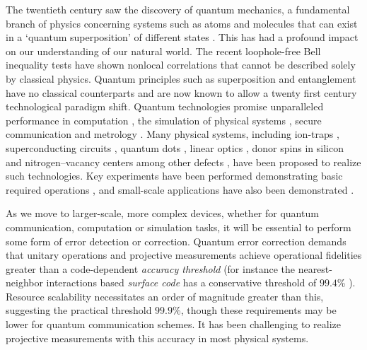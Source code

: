 \documentclass[aps,pra,amsmath,amssymb,reprint,superscriptaddress,tightenlines]{revtex4-1}
\begin{document}
The twentieth century saw the discovery of quantum mechanics, a fundamental branch of physics concerning systems such as atoms and molecules that can exist in a `quantum superposition' of different states \cite{Schrodinger26,vanderWaerden68}. This has had a profound impact on our understanding of our natural world. The recent loophole-free Bell inequality tests \cite{Giustina15,Shalm15,Hensen15,Hensen16} have shown nonlocal correlations that cannot be described solely by classical physics. Quantum principles such as superposition and entanglement \cite{Einstein35,Horodecki09} have no classical counterparts and are now known to allow a twenty first century technological paradigm shift. Quantum technologies promise unparalleled performance in computation \cite{Deutsch92,Simon94,Shor94,Grover96}, the simulation of physical systems \cite{Feynman82,Cirac12,Georgescu14}, secure communication \cite{Wiesner83,Bennett84} and metrology \cite{Giovannetti04,Giovannetti06,Paris09,Giovannetti11,DemkowiczDobrzanski12,Toth14,Taylor14}. Many physical systems, including ion-traps \cite{Cirac95,Wineland98,Cirac00,Kielpinski02,Leibfried03,Porras04,Haffner05,Blatt08, Haffner08,Kim10,Blatt12}, superconducting circuits \cite{Blais04,Wallraff04,You05,Hofheinz08,You11,Houck12,Devoret13,Xiang13,Barends14,Kelly15}, quantum dots \cite{Loss98,Burkard99,Imamoglu99,Benson00,Michler00,Petta05,Hennessy07,Hanson07,Kairdolf13}, linear optics \cite{Knill01,Kok07,OBrien07}, donor spins in silicon \cite{Kane98,Vrijen00,Morton08,Pla12,Tyryshkin12,Steger12,Pla13,Zwanenburg13} and nitrogen--vacancy centers among other defects \cite{Davies92,Zaitsev00,Jelezko06,Wrachtrup06,Greentree08,Weber10,Aharonovich11,Koehl11,Aharonovich11,Dzurak11,Gordon13}, have been proposed to realize such technologies. Key experiments have been performed demonstrating basic required operations \cite{Brouri00,Gaebel06,Togan10,Robledo11a,Maurer12,Zhou14,Rong15}, and small-scale applications have also been demonstrated \cite{Kurtsiefer00,Dutt07,Babinec10}.

As we move to larger-scale, more complex devices, whether for quantum communication, computation or simulation tasks, it will be essential to perform some form of error detection or correction. Quantum error correction demands that unitary operations and projective measurements achieve operational fidelities greater than a code-dependent \emph{accuracy threshold} (for instance the nearest-neighbor interactions based \emph{surface code} \cite{Dennis02} has a conservative threshold of $99.4$\% \cite{Stephens14}).  Resource scalability necessitates an order of magnitude greater than this, suggesting the practical threshold $99.9$\%, though these requirements may be lower for quantum communication schemes. It has been challenging to realize projective measurements with this accuracy in most physical systems.
\end{document}
